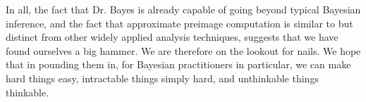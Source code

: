 In all, the fact that Dr. Bayes is already capable of going beyond typical Bayesian inference, and the fact that approximate preimage computation is similar to but distinct from other widely applied analysis techniques, suggests that we have found ourselves a big hammer.
We are therefore on the lookout for nails.
We hope that in pounding them in, for Bayesian practitioners in particular, we can make hard things easy, intractable things simply hard, and unthinkable things thinkable.

